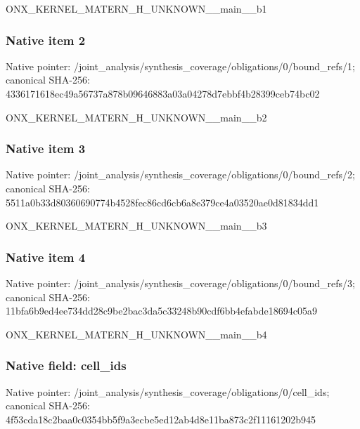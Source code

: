 \documentclass[10pt,a4paper]{article}
\begin{document}
\begingroup\raggedright\sloppy ONX\_\allowbreak{}KERNEL\_\allowbreak{}MATERN\_\allowbreak{}H\_\allowbreak{}UNKNOWN\_\allowbreak{}\_\allowbreak{}main\_\allowbreak{}\_\allowbreak{}b1\par\endgroup

\subsubsection{Native item 2}
Native pointer: /joint\_\allowbreak{}analysis/synthesis\_\allowbreak{}coverage/obligations/0/bound\_\allowbreak{}refs/1; canonical SHA-256: 4336171618ec49a56737a878b09646883a03a04278d7ebbf4b28399ceb74bc02

\begingroup\raggedright\sloppy ONX\_\allowbreak{}KERNEL\_\allowbreak{}MATERN\_\allowbreak{}H\_\allowbreak{}UNKNOWN\_\allowbreak{}\_\allowbreak{}main\_\allowbreak{}\_\allowbreak{}b2\par\endgroup

\subsubsection{Native item 3}
Native pointer: /joint\_\allowbreak{}analysis/synthesis\_\allowbreak{}coverage/obligations/0/bound\_\allowbreak{}refs/2; canonical SHA-256: 5511a0b33d80360690774b4528fec86cd6cb6a8e379ce4a03520ae0d81834dd1

\begingroup\raggedright\sloppy ONX\_\allowbreak{}KERNEL\_\allowbreak{}MATERN\_\allowbreak{}H\_\allowbreak{}UNKNOWN\_\allowbreak{}\_\allowbreak{}main\_\allowbreak{}\_\allowbreak{}b3\par\endgroup

\subsubsection{Native item 4}
Native pointer: /joint\_\allowbreak{}analysis/synthesis\_\allowbreak{}coverage/obligations/0/bound\_\allowbreak{}refs/3; canonical SHA-256: 11bfa6b9ed4ee734dd28c9be2bac3da5c33248b90cdf6bb4efabde18694c05a9

\begingroup\raggedright\sloppy ONX\_\allowbreak{}KERNEL\_\allowbreak{}MATERN\_\allowbreak{}H\_\allowbreak{}UNKNOWN\_\allowbreak{}\_\allowbreak{}main\_\allowbreak{}\_\allowbreak{}b4\par\endgroup

\subsubsection{Native field: cell\_\allowbreak{}ids}
Native pointer: /joint\_\allowbreak{}analysis/synthesis\_\allowbreak{}coverage/obligations/0/cell\_\allowbreak{}ids; canonical SHA-256: 4f53cda18c2baa0c0354bb5f9a3ecbe5ed12ab4d8e11ba873c2f11161202b945
\end{document}
